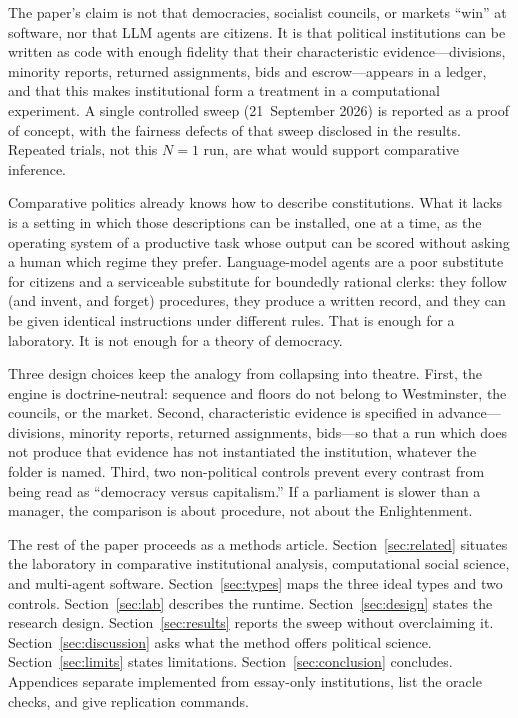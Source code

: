 \documentclass[11pt,a4paper]{article}
\begin{document}
The paper's claim is not that democracies, socialist councils, or markets ``win'' at
software, nor that LLM agents are citizens. It is that political institutions can be
written as code with enough fidelity that their characteristic evidence---divisions,
minority reports, returned assignments, bids and escrow---appears in a ledger, and that
this makes institutional form a treatment in a computational experiment. A single
controlled sweep (21~September 2026) is reported as a proof of concept, with the fairness
defects of that sweep disclosed in the results. Repeated trials, not this $N{=}1$ run, are
what would support comparative inference.

Comparative politics already knows how to describe constitutions. What it lacks is a
setting in which those descriptions can be installed, one at a time, as the operating
system of a productive task whose output can be scored without asking a human which
regime they prefer. Language-model agents are a poor substitute for citizens and a
serviceable substitute for boundedly rational clerks: they follow (and invent, and
forget) procedures, they produce a written record, and they can be given identical
instructions under different rules. That is enough for a laboratory. It is not enough
for a theory of democracy.

Three design choices keep the analogy from collapsing into theatre. First, the engine
is doctrine-neutral: sequence and floors do not belong to Westminster, the councils, or
the market. Second, characteristic evidence is specified in advance---divisions,
minority reports, returned assignments, bids---so that a run which does not produce
that evidence has not instantiated the institution, whatever the folder is named.
Third, two non-political controls prevent every contrast from being read as
``democracy versus capitalism.'' If a parliament is slower than a manager, the
comparison is about procedure, not about the Enlightenment.

The rest of the paper proceeds as a methods article. Section~\ref{sec:related} situates
the laboratory in comparative institutional analysis, computational social science, and
multi-agent software. Section~\ref{sec:types} maps the three ideal types and two controls.
Section~\ref{sec:lab} describes the runtime. Section~\ref{sec:design} states the research
design. Section~\ref{sec:results} reports the sweep without overclaiming it.
Section~\ref{sec:discussion} asks what the method offers political science.
Section~\ref{sec:limits} states limitations. Section~\ref{sec:conclusion} concludes.
Appendices separate implemented from essay-only institutions, list the oracle checks, and
give replication commands.
\end{document}
